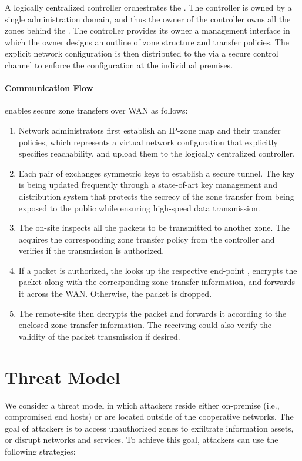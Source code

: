 A logically centralized controller orchestrates the \tps. The controller is owned 
by a single administration domain, and thus the owner of the controller owns all
the zones behind the \tps. The controller provides its owner a management interface
in which the owner designs an outline of zone structure and transfer policies. The
explicit network configuration is then distributed to the \tps via a secure control
channel to enforce the configuration at the individual premises.

\paragraph{Communication Flow}
\name enables secure zone transfers over WAN as follows:

\begin{enumerate}
	\item Network administrators first establish an IP-zone map and their transfer 
	policies, which represents a virtual network configuration that explicitly 
	specifies reachability, and upload them to the logically centralized 
	controller.
	\item Each pair of \tps exchanges symmetric keys to establish a secure tunnel. 
	The key is being updated frequently through a state-of-art key management and
	distribution system that protects the secrecy of the zone transfer from
	being exposed to the public while ensuring high-speed data transmission.
	\item The on-site \tp inspects all the packets to be transmitted to another zone.
	The \tp acquires the corresponding zone transfer policy from the controller
	and verifies if the transmission is authorized.
	\item If a packet is authorized, the \tp looks up the respective end-point \tp,
	encrypts the packet along with the corresponding zone transfer information,
	and forwards it across the WAN. Otherwise, the packet is dropped.
	\item The remote-site \tp then decrypts the packet and forwards it according to 
	the enclosed zone transfer information. The receiving \tp could also verify
	the validity of the packet transmission if desired.
\end{enumerate}


\section{Threat Model}
\label{sec:threatmodel}
We consider a threat model in which attackers reside either on-premise (i.e., compromised 
end hosts) or are located
outside of the cooperative networks. The goal of attackers is to access unauthorized zones 
to exfiltrate information assets, or disrupt networks and services. To achieve this goal, 
attackers can use the following strategies:

